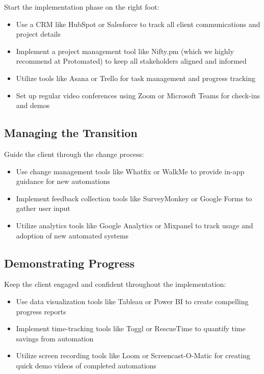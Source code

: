 Start the implementation phase on the right foot:

\begin{itemize}
    \item Use a CRM like HubSpot or Salesforce to track all client communications and project details
    \item Implement a project management tool like Nifty.pm (which we highly recommend at Protomated) to keep all stakeholders aligned and informed
    \item Utilize tools like Asana or Trello for task management and progress tracking
    \item Set up regular video conferences using Zoom or Microsoft Teams for check-ins and demos
\end{itemize}

\subsection{Managing the Transition}

Guide the client through the change process:

\begin{itemize}
    \item Use change management tools like Whatfix or WalkMe to provide in-app guidance for new automations
    \item Implement feedback collection tools like SurveyMonkey or Google Forms to gather user input
    \item Utilize analytics tools like Google Analytics or Mixpanel to track usage and adoption of new automated systems
\end{itemize}

\subsection{Demonstrating Progress}

Keep the client engaged and confident throughout the implementation:

\begin{itemize}
    \item Use data visualization tools like Tableau or Power BI to create compelling progress reports
    \item Implement time-tracking tools like Toggl or RescueTime to quantify time savings from automation
    \item Utilize screen recording tools like Loom or Screencast-O-Matic for creating quick demo videos of completed automations
\end{itemize}

